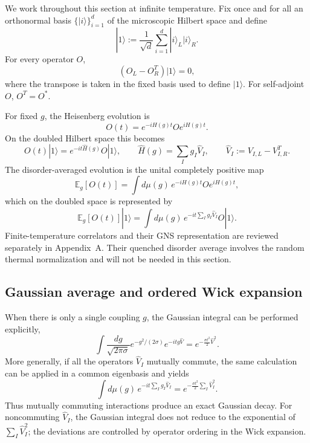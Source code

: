 \documentclass{article}
\theoremstyle{definition}
\begin{document}
We work throughout this section at infinite temperature.  Fix once and for
all an orthonormal basis $\{|i\rangle\}_{i=1}^d$ of the microscopic Hilbert
space and define
\begin{equation}
    |1\rangle
    :=\frac{1}{\sqrt d}\sum_{i=1}^d|i\rangle_L|i\rangle_R.
\end{equation}
For every operator $O$,
\begin{equation}
    (O_L-O_R^T)|1\rangle=0,
\end{equation}
where the transpose is taken in the fixed basis used to define $|1\rangle$.
For self-adjoint $O$, $O^T=O^*$.

For fixed $g$, the Heisenberg evolution is
\begin{equation}
    O(t)=e^{-iH(g)t}Oe^{iH(g)t}.
\end{equation}
On the doubled Hilbert space this becomes
\begin{equation}
    O(t)|1\rangle
    =e^{-it\widehat H(g)}O|1\rangle,
    \qquad
    \widehat H(g)=\sum_I g_I\widehat V_I,
    \qquad
    \widehat V_I:=V_{I,L}-V_{I,R}^T.
\end{equation}
The disorder-averaged evolution is the unital completely positive map
\begin{equation}
    \mathbb E_g[O(t)]
    =\int d\mu(g)\,
      e^{-iH(g)t}Oe^{iH(g)t},
\end{equation}
which on the doubled space is represented by
\begin{equation}
    \mathbb E_g[O(t)]|1\rangle
    =\int d\mu(g)\,
      e^{-it\sum_I g_I\widehat V_I}O|1\rangle.
\end{equation}
Finite-temperature correlators and their GNS representation are reviewed
separately in Appendix~A.  Their quenched disorder average involves the
random thermal normalization and will not be needed in this section.


\subsection{Gaussian average and ordered Wick expansion}

When there is only a single coupling $g$, the Gaussian integral can be
performed explicitly,
\begin{equation}
    \int\frac{dg}{\sqrt{2\pi\sigma}}
    e^{-g^2/(2\sigma)}e^{-itg\widehat V}
    =e^{-\frac{\sigma t^2}{2}\widehat V^2}.
\end{equation}
More generally, if all the operators $\widehat V_I$ mutually commute, the
same calculation can be applied in a common eigenbasis and yields
\begin{equation}
    \int d\mu(g)\,
    e^{-it\sum_Ig_I\widehat V_I}
    =
    e^{-\frac{\sigma t^2}{2}\sum_I\widehat V_I^2}.
\end{equation}
Thus mutually commuting interactions produce an exact Gaussian decay.
For noncommuting $\widehat V_I$, the Gaussian integral does not reduce to
the exponential of $\sum_I\widehat V_I^2$; the deviations are controlled
by operator ordering in the Wick expansion.
\end{document}
